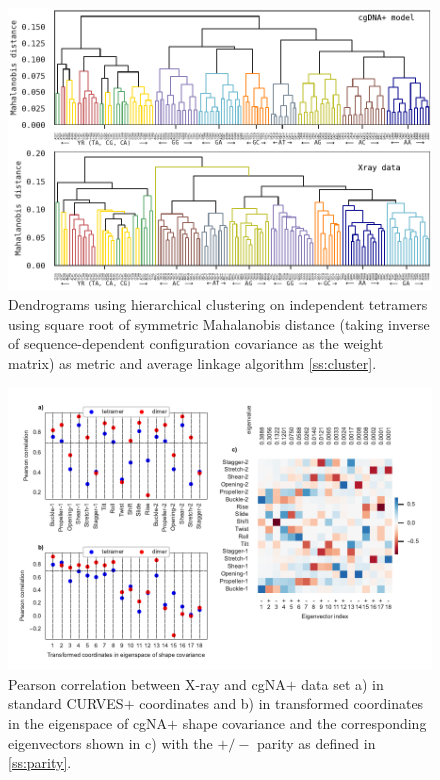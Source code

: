 \begin{figure}[htb!]
	\begin{center}
	\centering\includegraphics[scale=1]{./Xray_images/Dendrogram_cgxray_X3.pdf}
	\centering\caption{Dendrograms using hierarchical clustering on independent tetramers using square root of symmetric Mahalanobis distance (taking inverse of sequence-dependent configuration covariance as the weight matrix) as metric and average linkage algorithm \cref{ss:cluster}.
	}
\label{fig:cluster}
\end{center}
\end{figure}
\begin{figure}[htb!]
	\begin{center}
	\centering\includegraphics[scale=0.96]{./Xray_images/X3_CG_256_PC_one_one.pdf}
	\centering\caption{Pearson correlation between X-ray and cgNA$+$ data set a) in standard CURVES$+$ coordinates and b) in transformed coordinates in the eigenspace of cgNA$+$ shape covariance and the corresponding eigenvectors shown in c) with the $+/-$ parity as defined in \cref{ss:parity}.
	}
\label{fig:PC_one_one}
\end{center}
\end{figure}

